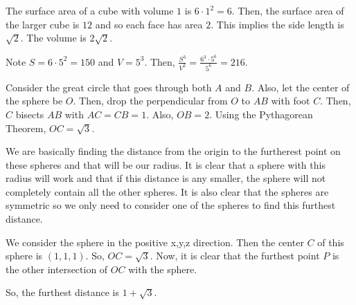 \documentclass[11pt]{article}
\begin{document}

\begin{sol}
The surface area of a cube with volume $1$ is $6\cdot 1^2=6$. Then, the surface area of the larger cube is $12$ and so each face has area $2$. This implies the side length is $\sqrt{2}$. The volume is $2\sqrt{2}$.
\end{sol}


\begin{sol}
Note $S=6\cdot 5^2=150$ and $V=5^3$. Then, $\frac{S^3}{V^2}=\frac{6^3\cdot 5^6}{5^6}=\boxed{216}$.
\end{sol}


\begin{sol}
Consider the great circle that goes through both $A$ and $B$. Also, let the center of the sphere be $O$. Then, drop the perpendicular from $O$ to $AB$ with foot $C$. Then, $C$ bisects $AB$ with $AC=CB=1$. Also, $OB=2$. Using the Pythagorean Theorem, $OC=\boxed{\sqrt{3}}$.
\end{sol}


\begin{sol}
We are basically finding the distance from the origin to the furtherest point on these spheres and that will be our radius. It is clear that a sphere with this radius will work and that if this distance is any smaller, the sphere will not completely contain all the other spheres. It is also clear that the spheres are symmetric so we only need to consider one of the spheres to find this furthest distance.  

We consider the sphere in the positive x,y,z direction. Then the center $C$ of this sphere is $(1,1,1)$. So, $OC=\sqrt{3}$. Now, it is clear that the furthest point $P$ is the other intersection of $OC$ with the sphere. 

So, the furthest distance is $\boxed{1+\sqrt{3}}$.
\end{sol}
\end{document}
